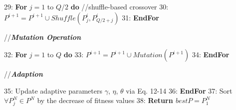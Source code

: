 \documentclass[lettersize,journal]{IEEEtran}
\begin{document}
\begin{algorithm}[t]
\begin{small}
\begin{algorithmic}[0]
				
				\STATE \hspace{-0.3cm} {\small 29:} \hspace{-0.05cm}  \hspace{0.25cm} \textbf{For} $j=1$ to $Q/2$ \textbf{do} //shuffle-based crossover	
				\STATE \hspace{-0.3cm} {\small 30:} \hspace{-0.05cm}  \hspace{0.5cm} $P^{i+1} = P^{i+1} \cup Shuffle(P^{i}_{j},P^i_{Q/2+j})$ 
				\STATE \hspace{-0.3cm} {\small 31:} \hspace{-0.05cm}  \hspace{0.25cm}  \textbf{EndFor}
			\end{algorithmic} 
			//\textbf{{\emph{\textcolor[rgb]{0,0,0}{Mutation Operation}}}}
			\begin{algorithmic}[0]
				\STATE \hspace{-0.3cm} {\small 32:} \hspace{-0.05cm}  \hspace{0.25cm} \textbf{For} $j=1$ to $Q$ \textbf{do} %
				\STATE \hspace{-0.3cm} {\small 33:} \hspace{-0.05cm}  \hspace{0.5cm} $P^{i+1}=P^{i+1}\cup Mutation(P^{i+1})$
				\STATE \hspace{-0.3cm} {\small 34:} \hspace{-0.05cm}  \hspace{0.25cm}  \textbf{EndFor}
			\end{algorithmic} 
			//\textbf{{\emph{\textcolor[rgb]{0,0,0}{Adaption}}}}
			\begin{algorithmic}[0]
				\STATE \hspace{-0.3cm} {\small 35:} \hspace{-0.05cm}  \hspace{0.25cm} Update adaptive parameters $\gamma$, $\eta$, $\theta$ via Eq. {12-14}
				\STATE \hspace{-0.3cm} {\small 36:} \hspace{-0.12cm}  \textbf{EndFor}
				\STATE \hspace{-0.3cm} {\small 37:} \hspace{-0.12cm}  Sort $\forall P^N_j \in P^N$ by the decrease of fitness values
				\STATE \hspace{-0.3cm} {\small 38:} \hspace{-0.12cm}  \textbf{Return $bestP=P^N_1$} 
			\end{algorithmic} 
		\end{small}
		\label{alg:alg2} 
	\end{algorithm} 
	
\end{document}
